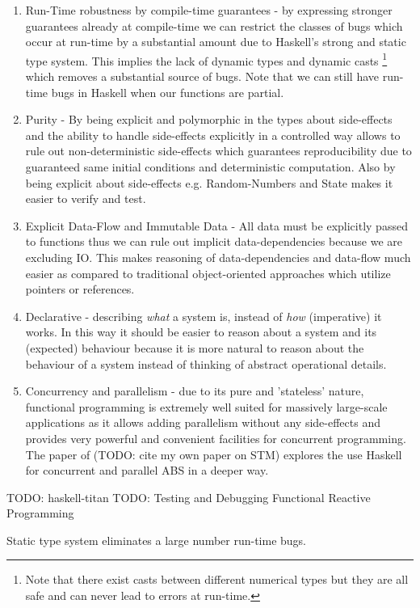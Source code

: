 \begin{enumerate}
	\item Run-Time robustness by compile-time guarantees - by expressing stronger guarantees already at compile-time we can restrict the classes of bugs which occur at run-time by a substantial amount due to Haskell's strong and static type system.  This implies the lack of dynamic types and dynamic casts \footnote{Note that there exist casts between different numerical types but they are all safe and can never lead to errors at run-time.} which removes a substantial source of bugs.  Note that we can still have run-time bugs in Haskell when our functions are partial.
	\item Purity - By being explicit and polymorphic in the types about side-effects and the ability to handle side-effects explicitly in a controlled way allows to rule out non-deterministic side-effects which guarantees reproducibility due to guaranteed same initial conditions and deterministic computation. Also by being explicit about side-effects e.g. Random-Numbers and State makes it easier to verify and test.
	\item Explicit Data-Flow and Immutable Data - All data must be explicitly passed to functions thus we can rule out implicit data-dependencies because we are excluding IO. This makes reasoning of data-dependencies and data-flow much easier as compared to traditional object-oriented approaches which utilize pointers or references.
	\item Declarative - describing \textit{what} a system is, instead of \textit{how} (imperative) it works. In this way it should be easier to reason about a system and its (expected) behaviour because it is more natural to reason about the behaviour of a system instead of thinking of abstract operational details.
	\item Concurrency and parallelism - due to its pure and 'stateless' nature, functional programming is extremely well suited for massively large-scale applications as it allows adding parallelism without any side-effects and provides very powerful and convenient facilities for concurrent programming. The paper of (TODO: cite my own paper on STM) explores the use Haskell for concurrent and parallel ABS in a deeper way.
\end{enumerate}

TODO: haskell-titan
TODO: Testing and Debugging Functional Reactive Programming \cite{perez_testing_2017}

Static type system eliminates a large number run-time bugs.

